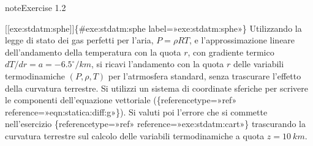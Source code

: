 \documentclass[letterpaper,10pt,italian]{jupyterBook}
\begin{document}
\begin{sphinxadmonition}{note}{Exercise 1.2}



\sphinxAtStartPar
{[}{[}exe:stdatm:sphe{]}{]}\{\#exe:stdatm:sphe label=»exe:stdatm:sphe»\}
Utilizzando la legge di stato dei gas perfetti per l’aria,
\(P = \rho R T\), e l’approssimazione lineare dell’andamento della
temperatura con la quota \(r\), con gradiente termico
\(dT/dr=a=-6.5^\circ/km\), si ricavi l’andamento con la quota \(r\) delle
variabili termodinamiche \((P,\rho, T)\) per l’atrmosfera standard, senza
trascurare l’effetto della curvatura terrestre. Si utilizzi un sistema
di coordinate sferiche per scrivere le componenti dell’equazione
vettoriale
(\{reference\sphinxhyphen{}type=»ref»
reference=»eqn:statica:diff:g»\}). Si valuti poi l’errore che si commette
nell’esercizio
\{reference\sphinxhyphen{}type=»ref»
reference=»exe:stdatm:cart»\} trascurando la curvatura terrestre sul
calcolo delle variabili termodinamiche a quota \(z = 10 \ km\).
\end{sphinxadmonition}
\end{document}
